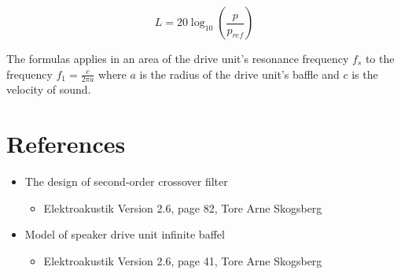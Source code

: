 \begin{equation}
L=20\log_{10}\left(\frac{p}{p_{ref}}\right)
\label{eq:soundpressure}
\end{equation}

The formulas applies in an area of the drive unit's resonance frequency $f_s$ to the frequency $f_1=\frac{c}{2\pi a}$ where $a$ is the radius of the drive unit's baffle and $c$ is the velocity of sound.\cite[p.~41]{Elektroakustik}

\section{References}
\begin{itemize}
	\item The design of second-order crossover filter
	\begin{itemize}
		\item Elektroakustik Version 2.6, page 82, Tore Arne Skogsberg
	\end{itemize}
	\item Model of speaker drive unit infinite baffel
	\begin{itemize}
		\item Elektroakustik Version 2.6, page 41, Tore Arne Skogsberg
	\end{itemize}
\end{itemize}



\FloatBarrier
